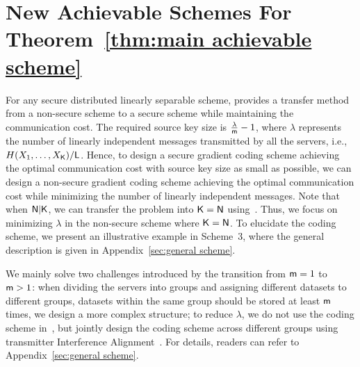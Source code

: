 \documentclass[conference,letterpaper]{IEEEtran}
\begin{document}
\section{New Achievable Schemes For Theorem~\ref{thm:main achievable scheme}}
\label{sec:Achievable coding scheme}

For any secure distributed linearly separable scheme, \cite[Theorem 1]{wan2022secure} provides a transfer method from a non-secure scheme to a secure scheme while maintaining the communication cost.
The required source key size is $\frac{\lambda}{{\sf m}} - 1$, where $\lambda$ represents the number of linearly independent messages transmitted by all the servers, i.e., $H(X_1,\ldots, X_{{\sf K}})/{\sf L}$. Hence, to design a secure gradient coding scheme achieving the optimal communication cost with source key size as small as possible, we can design 
a non-secure gradient coding scheme achieving the optimal communication cost while minimizing the number of linearly independent messages.
Note that when ${\sf N} | {\sf K} $, we can transfer the problem into ${\sf K} = {\sf N}$ using~\cite[Remark 1]{wan2022secure}.  Thus, we focus on minimizing $\lambda$ in the non-secure scheme where ${\sf K}= {\sf N}$. To elucidate the coding scheme, we present an illustrative example in Scheme~3, where the general description is given in Appendix~\ref{sec:general scheme}.

We mainly solve two challenges introduced by the transition from ${\sf m}=1$ to ${\sf m} > 1$: when dividing the servers into groups and assigning different datasets to different groups, datasets within the same group should be stored at least ${\sf m}$ times, we design a more complex structure; to reduce $\lambda$, we do not use the coding scheme in~\cite{Heterogeneous_Gradient_Coding}, but jointly design the coding scheme across different groups using transmitter Interference Alignment~\cite{2008Interference_Alignment, MIMO_interference_channel, huang2023ISITversion}.   
For details,  readers can refer to Appendix~\ref{sec:general scheme}.
\end{document}
